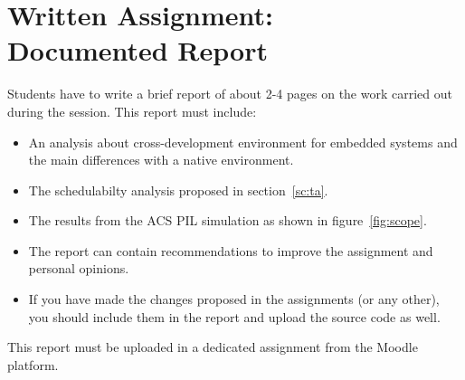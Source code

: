 \chapter*{Written Assignment: \\\vspace{7mm} Documented Report}

Students have to write a brief report of about 2-4 pages
on the work carried out during the session.
This report must include:

\begin{itemize}
	\item An analysis about cross-development environment for embedded systems and the main differences with a native environment.
	\item The schedulabilty analysis proposed in section~\ref{sc:ta}.
	\item The results from the ACS PIL simulation as shown in figure~\ref{fig:scope}.
	\item The report can contain recommendations to improve the assignment and personal opinions.
	\item If you have made the changes proposed in the assignments (or any other), you should include them in the report and upload the source code as well.
\end{itemize}

This report must be uploaded in a dedicated assignment from the Moodle platform.